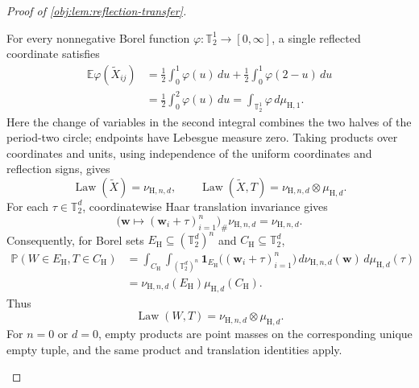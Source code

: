 \begin{proof}[Proof of \cref{obj:lem:reflection-transfer}]
\begin{enumerate}
For every nonnegative Borel function
\(\varphi:\mathbb T_2^1\to[0,\infty]\), a single reflected coordinate
satisfies
\[
\begin{aligned}
\mathbb E\varphi(\widetilde X_{ij})
&=\frac12\int_0^1\varphi(u)\,du
  +\frac12\int_0^1\varphi(2-u)\,du\\
&=\frac12\int_0^2\varphi(u)\,du
 =\int_{\mathbb T_2^1}\varphi\,d\mu_{\mathrm H,1}.
\end{aligned}
\]
Here the change of variables in the second integral combines the two
halves of the period-two circle; endpoints have Lebesgue measure zero.
Taking products over coordinates and units, using independence of the
uniform coordinates and reflection signs, gives
\[
\operatorname{Law}(\widetilde X)=\nu_{\mathrm H,n,d},
\qquad
\operatorname{Law}(\widetilde X,T)
=\nu_{\mathrm H,n,d}\otimes\mu_{\mathrm H,d}.
\]
For each \(\tau\in\mathbb T_2^d\), coordinatewise Haar translation
invariance gives
\[
\bigl(\mathbf w\mapsto
(\mathbf w_i+\tau)_{i=1}^n\bigr)_{\#}
\nu_{\mathrm H,n,d}
=\nu_{\mathrm H,n,d}.
\]
Consequently, for Borel sets
\(E_{\mathrm H}\subseteq(\mathbb T_2^d)^n\) and
\(C_{\mathrm H}\subseteq\mathbb T_2^d\),
\[
\begin{aligned}
\mathbb P(W\in E_{\mathrm H},T\in C_{\mathrm H})
&=\int_{C_{\mathrm H}}
  \int_{(\mathbb T_2^d)^n}
  \mathbf1_{E_{\mathrm H}}
  \bigl((\mathbf w_i+\tau)_{i=1}^n\bigr)
  \,d\nu_{\mathrm H,n,d}(\mathbf w)
  \,d\mu_{\mathrm H,d}(\tau)\\
&=\nu_{\mathrm H,n,d}(E_{\mathrm H})
  \mu_{\mathrm H,d}(C_{\mathrm H}).
\end{aligned}
\]
Thus
\[
\operatorname{Law}(W,T)
=\nu_{\mathrm H,n,d}\otimes\mu_{\mathrm H,d}.
\]
For \(n=0\) or \(d=0\), empty products are point masses on the
corresponding unique empty tuple, and the same product and translation
identities apply.


\end{enumerate}
\end{proof}
